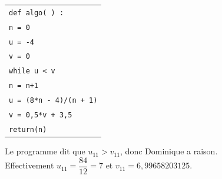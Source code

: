\documentclass[10pt]{article}
\begin{document}
\begin{center}
\begin{tabularx}{0.5\linewidth}{|X|}\hline
\quad \texttt{def algo( )  :}\\
\quad \texttt{n = 0}\\
\quad \texttt{u = -4}\\
\quad \texttt{v = 0}\\
\quad \texttt{while u < v}\\
\qquad \texttt{n = n+1}\\
\qquad \texttt{u = (8*n - 4)/(n + 1)}\\ 
\qquad \texttt{v = 0,5*v + 3,5}\\
\quad \texttt{return(n)}\\ \hline
\end{tabularx}
\end{center}

	
	Le programme dit que $u_{11} > v_{11}$, donc Dominique a raison.\\ Effectivement $u_{11} = \dfrac{84}{12} = 7$ et $v_{11} = 6,99658203125$.
\end{document}

